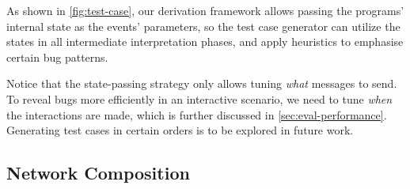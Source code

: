 As shown in \autoref{fig:test-case}, our derivation framework allows passing the
programs' internal state as the events' parameters, so the test case
generator can utilize the states in all intermediate interpretation phases, and
apply heuristics to emphasise certain bug patterns.


Notice that the state-passing strategy only allows tuning {\em what} messages to
send.  To reveal bugs more efficiently in an interactive scenario, we need to
tune {\em when} the interactions are made, which is further discussed in
\autoref{sec:eval-performance}.  Generating test cases in certain orders is to
be explored in future work.

\pagebreak
\subsection{Network Composition}
\label{sec:net-compose}

